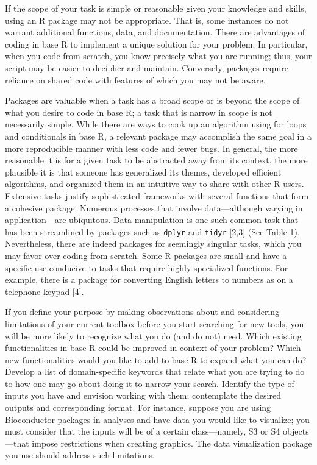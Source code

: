 \documentclass[10pt,letterpaper]{article}
\begin{document}
If the scope of your task is simple or reasonable given your knowledge
and skills, using an R package may not be appropriate. That is, some
instances do not warrant additional functions, data, and documentation.
There are advantages of coding in base R to implement a unique solution
for your problem. In particular, when you code from scratch, you know
precisely what you are running; thus, your script may be easier to
decipher and maintain. Conversely, packages require reliance on shared
code with features of which you may not be aware.

Packages are valuable when a task has a broad scope or is beyond the
scope of what you desire to code in base R; a task that is narrow in
scope is not necessarily simple. While there are ways to cook up an
algorithm using for loops and conditionals in base R, a relevant package
may accomplish the same goal in a more reproducible manner with less
code and fewer bugs. In general, the more reasonable it is for a given
task to be abstracted away from its context, the more plausible it is
that someone has generalized its themes, developed efficient algorithms,
and organized them in an intuitive way to share with other R users.
Extensive tasks justify sophisticated frameworks with several functions
that form a cohesive package. Numerous processes that involve
data---although varying in application---are ubiquitous. Data
manipulation is one such common task that has been streamlined by
packages such as \texttt{dplyr} and \texttt{tidyr} {[}2,3{]} (See Table
1). Nevertheless, there are indeed packages for seemingly singular
tasks, which you may favor over coding from scratch. Some R packages are
small and have a specific use conducive to tasks that require highly
specialized functions. For example, there is a package for converting
English letters to numbers as on a telephone keypad {[}4{]}.

If you define your purpose by making observations about and considering
limitations of your current toolbox before you start searching for new
tools, you will be more likely to recognize what you do (and do not)
need. Which existing functionalities in base R could be improved in
context of your problem? Which new functionalities would you like to add
to base R to expand what you can do? Develop a list of domain-specific
keywords that relate what you are trying to do to how one may go about
doing it to narrow your search. Identify the type of inputs you have and
envision working with them; contemplate the desired outputs and
corresponding format. For instance, suppose you are using Bioconductor
packages in analyses and have data you would like to visualize; you must
consider that the inputs will be of a certain class---namely, S3 or S4
objects---that impose restrictions when creating graphics. The data
visualization package you use should address such limitations.
\end{document}
